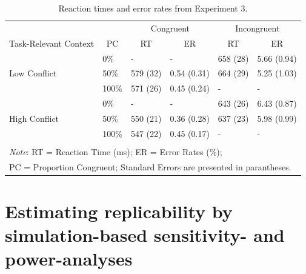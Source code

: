 \documentclass[english,,man,floatsintext]{apa6}
\begin{document}
\begin{table}[htbp]
\caption{Reaction times and error rates from Experiment 3.}
\label{TR_table_3}
\centering
\begin{tabular}{llcccc}
\toprule
& & \multicolumn{2}{c}{Congruent} & \multicolumn{2}{c}{Incongruent} \\
\cmidrule(rl){3-4}
\cmidrule(rl){5-6}
\multicolumn{1}{c}{Task-Relevant Context} & \multicolumn{1}{c}{PC} & \multicolumn{1}{c}{RT} & \multicolumn{1}{c}{ER} & \multicolumn{1}{c}{RT} & \multicolumn{1}{c}{ER}  \\
\midrule
\multirow{3}{*}{Low Conflict} & \multicolumn{1}{l}{0\%} & \multicolumn{1}{l}{-} & \multicolumn{1}{l}{-} & \multicolumn{1}{l}{658 (28)} & \multicolumn{1}{l}{5.66 (0.94)} \\
& \multicolumn{1}{l}{50\%} & \multicolumn{1}{l}{579 (32)} & \multicolumn{1}{l}{0.54 (0.31)} & \multicolumn{1}{l}{664 (29)} & \multicolumn{1}{l}{5.25 (1.03)} \\
& \multicolumn{1}{l}{100\%} & \multicolumn{1}{l}{571 (26)} & \multicolumn{1}{l}{0.45 (0.24)} & \multicolumn{1}{l}{-} & \multicolumn{1}{l}{-} \\
\midrule
\multirow{3}{*}{High Conflict} & \multicolumn{1}{l}{0\%} & \multicolumn{1}{l}{-} & \multicolumn{1}{l}{-} & \multicolumn{1}{l}{643 (26)} & \multicolumn{1}{l}{6.43 (0.87)} \\
& \multicolumn{1}{l}{50\%} & \multicolumn{1}{l}{550 (21)} & \multicolumn{1}{l}{0.36 (0.28)} & \multicolumn{1}{l}{637 (23)} & \multicolumn{1}{l}{5.98 (0.99)} \\
& \multicolumn{1}{l}{100\%} & \multicolumn{1}{l}{547 (22)} & \multicolumn{1}{l}{0.45 (0.17)} & \multicolumn{1}{l}{-} & \multicolumn{1}{l}{-} \\
 & & & & & \\
\bottomrule
\multicolumn{6}{l}{\textit{Note}: RT = Reaction Time (ms);  ER = Error Rates (\%);} \\
\multicolumn{6}{l}{PC = Proportion Congruent; Standard Errors are presented in parantheses.} \\
\end{tabular}%
\end{table}

\hypertarget{estimating-replicability-by-simulation-based-sensitivity--and-power-analyses}{%
\section{Estimating replicability by simulation-based sensitivity- and power-analyses}\label{estimating-replicability-by-simulation-based-sensitivity--and-power-analyses}}
\end{document}
